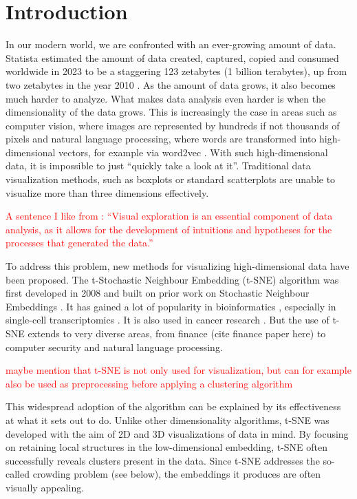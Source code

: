 \chapter{Introduction}

In our modern world, we are confronted with an ever-growing amount of data. 
Statista estimated the amount of data created, captured, copied and consumed worldwide in 2023 to be a staggering 123 zetabytes (1 billion terabytes), up from two zetabytes in the year 2010 \cite{Statista}.
As the amount of data grows, it also becomes much harder to analyze. 
What makes data analysis even harder is when the dimensionality of the data grows. 
This is increasingly the case in areas such as computer vision, where images are represented by hundreds if not thousands of pixels and natural language processing, where words are transformed into high-dimensional vectors, for example via word2vec \cite{word2vec}.
With such high-dimensional data, it is impossible to just \enquote{quickly take a look at it}. 
Traditional data visualization methods, such as boxplots or standard scatterplots are unable to visualize more than three dimensions effectively. 

\textcolor{red}{A sentence I like from \cite{vdMaa14}: \enquote{Visual exploration is an essential component of data analysis, as it allows for the development of intuitions and hypotheses for the processes that generated the data.}}

To address this problem, new methods for visualizing high-dimensional data have been proposed. 
The t-Stochastic Neighbour Embedding (t-SNE) algorithm was first developed in 2008 \cite{vdMaa08} and built on prior work on Stochastic Neighbour Embeddings \cite{Hinton02}. 
It has gained a lot of popularity in bioinformatics \cite{BioInfo1, BioInfo2, BioInfo3}, especially in  single-cell transcriptomics \cite{Macosko_dataset, tasic18, cao19}. 
It is also used in cancer research \cite{cancer1, cancer2, cancer3}.  
But the use of t-SNE extends to very diverse areas, from finance (cite finance paper here) to computer security and natural language processing. 

\textcolor{red}{maybe mention that t-SNE is not only used for visualization, but can for example also be used as preprocessing before applying a clustering algorithm}

This widespread adoption of the algorithm can be explained by its effectiveness at what it sets out to do. Unlike other dimensionality algorithms, t-SNE was developed with the aim of 2D and 3D visualizations of data in mind. 
By focusing on retaining local structures in the low-dimensional embedding, t-SNE often successfully reveals clusters present in the data. 
Since t-SNE addresses the so-called crowding problem (see below), the embeddings it produces are often visually appealing.  

